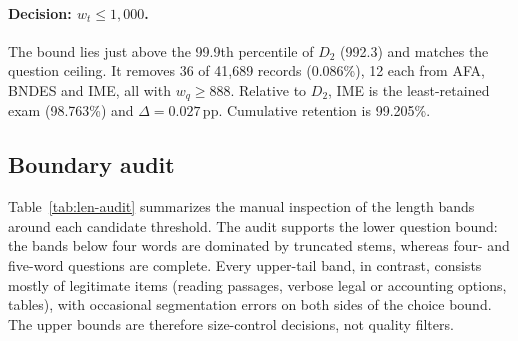 \paragraph{Decision: $w_t \le 1{,}000$.} The bound lies just above the 99.9th
percentile of $D_2$ (992.3) and matches the question ceiling. It removes 36
of 41,689 records (0.086\%), 12 each from AFA, BNDES and IME, all with
$w_q \ge 888$. Relative to $D_2$, IME is the least-retained exam (98.763\%)
and $\Delta = 0.027$\,pp. Cumulative retention is 99.205\%.

\subsection{Boundary audit}
\label{app:len-audit}

Table~\ref{tab:len-audit} summarizes the manual inspection of the length
bands around each candidate threshold. The audit supports the lower question
bound: the bands below four words are dominated by truncated stems, whereas
four- and five-word questions are complete. Every upper-tail band, in
contrast, consists mostly of legitimate items (reading passages, verbose legal
or accounting options, tables), with occasional segmentation errors on both
sides of the choice bound. The upper bounds are therefore size-control
decisions, not quality filters.

